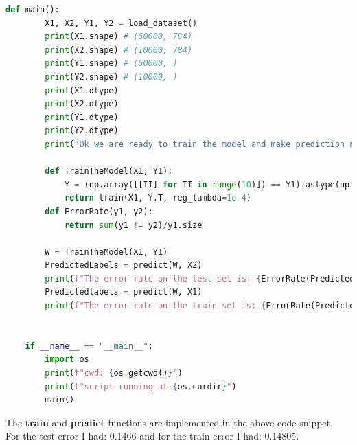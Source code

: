 \documentclass[]{article}
\begin{document}
\begin{lstlisting}[language=python]
    def main():
        X1, X2, Y1, Y2 = load_dataset()
        print(X1.shape) # (60000, 784)
        print(X2.shape) # (10000, 784)
        print(Y1.shape) # (60000, )
        print(Y2.shape) # (10000, )
        print(X1.dtype)
        print(X2.dtype)
        print(Y1.dtype)
        print(Y2.dtype)
        print("Ok we are ready to train the model and make prediction now. ")

        def TrainTheModel(X1, Y1):
            Y = (np.array([[II] for II in range(10)]) == Y1).astype(np.float)
            return train(X1, Y.T, reg_lambda=1e-4)
        def ErrorRate(y1, y2):
            return sum(y1 != y2)/y1.size

        W = TrainTheModel(X1, Y1)
        PredictedLabels = predict(W, X2)
        print(f"The error rate on the test set is: {ErrorRate(PredictedLabels, Y2)}")
        Predictedlabels = predict(W, X1)
        print(f"The error rate on the train set is: {ErrorRate(Predictedlabels, Y1)}")
    

    if __name__ == "__main__":
        import os
        print(f"cwd: {os.getcwd()}")
        print(f"script running at {os.curdir}")
        main()
            \end{lstlisting}
    The \textbf{train} and \textbf{predict} functions are implemented in the above code snippet. 
    \\
    For the test error I had: 0.1466 and for the train error I had: 0.14805. 


        
\end{document}
